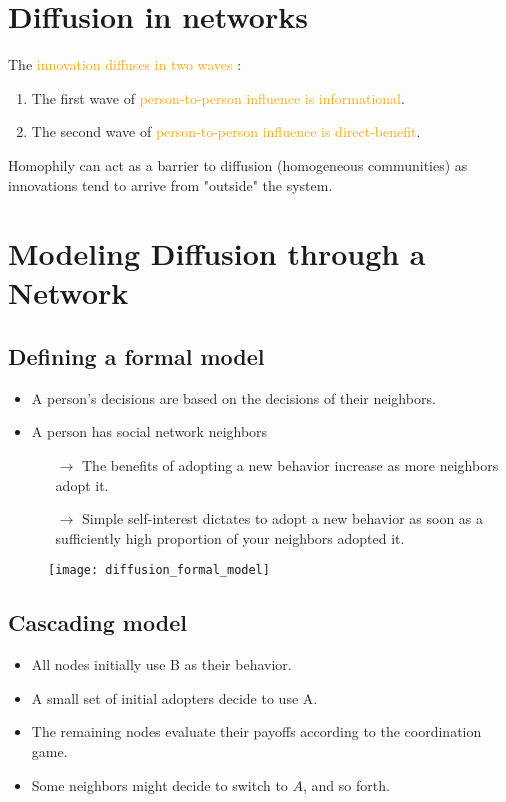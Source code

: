 \section{Diffusion in networks}

The \textcolor{orange}{innovation diffuses in two waves} :
\begin{enumerate}
\item The first wave of \textcolor{orange}{person-to-person influence is informational}.
\item The second wave of \textcolor{orange}{person-to-person influence is direct-benefit}.
\end{enumerate}
Homophily can act as a barrier to diffusion (homogeneous communities) as innovations tend to arrive from "outside" the system.

\section{Modeling Diffusion through a Network}

\subsection{Defining a formal model}

\begin{itemize}
\item A person's decisions are based on the decisions of their neighbors.
\item A person has social network neighbors
	\begin{itemize}
	\item[$\rightarrow$] The benefits of adopting a new behavior increase as more neighbors adopt it.
	\item[$\rightarrow$] Simple self-interest dictates to adopt a new behavior as soon as a sufficiently high proportion of your neighbors adopted it.
	\end{itemize}
\end{itemize}

\begin{figure}[H]
    \centering
    \texttt{[image: diffusion\_formal\_model]}
\end{figure}

\subsection{Cascading model}

\begin{itemize}
\item All nodes initially use B as their behavior.
\item A small set of initial adopters decide to use A.
\item The remaining nodes evaluate their payoffs according to the coordination game.
\item Some neighbors might decide to switch to $A$, and so forth.
\end{itemize}

